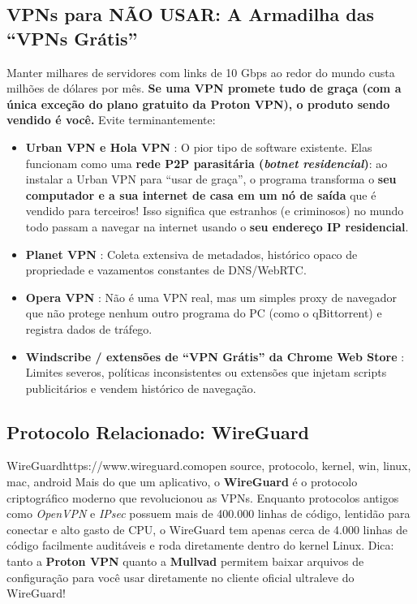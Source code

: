 \documentclass{pousadaguide}
\begin{document}
\subsection{VPNs para NÃO USAR: A Armadilha das “VPNs Grátis”}

\begin{perigo}
Manter milhares de servidores com links de 10 Gbps ao redor do mundo custa milhões de dólares por mês. \textbf{Se uma VPN promete tudo de graça (com a única exceção do plano gratuito da Proton VPN), o produto sendo vendido é você.} Evite terminantemente:
\begin{itemize}
  \item \textbf{Urban VPN e Hola VPN} : O pior tipo de software existente. Elas funcionam como uma \textbf{rede P2P parasitária (\emph{botnet residencial})}: ao instalar a Urban VPN para ``usar de graça'', o programa transforma o \textbf{seu computador e a sua internet de casa em um nó de saída} que é vendido para terceiros! Isso significa que estranhos (e criminosos) no mundo todo passam a navegar na internet usando o \textbf{seu endereço IP residencial}.
  \item \textbf{Planet VPN} : Coleta extensiva de metadados, histórico opaco de propriedade e vazamentos constantes de DNS/WebRTC.
  \item \textbf{Opera VPN} : Não é uma VPN real, mas um simples proxy de navegador que não protege nenhum outro programa do PC (como o qBittorrent) e registra dados de tráfego.
  \item \textbf{Windscribe / extensões de ``VPN Grátis'' da Chrome Web Store} : Limites severos, políticas inconsistentes ou extensões que injetam scripts publicitários e vendem histórico de navegação.
\end{itemize}
\end{perigo}

\subsection{Protocolo Relacionado: WireGuard}

\begin{ferramenta}[recomendado,logo=wireguard]{WireGuard}{https://www.wireguard.com}{open source, protocolo, kernel, win, linux, mac, android}
Mais do que um aplicativo, o \textbf{WireGuard} é o protocolo criptográfico moderno que revolucionou as VPNs. Enquanto protocolos antigos como \emph{OpenVPN} e \emph{IPsec} possuem mais de 400.000 linhas de código, lentidão para conectar e alto gasto de CPU, o WireGuard tem apenas cerca de 4.000 linhas de código facilmente auditáveis e roda diretamente dentro do kernel Linux. Dica: tanto a \textbf{Proton VPN} quanto a \textbf{Mullvad} permitem baixar arquivos de configuração  para você usar diretamente no cliente oficial ultraleve do WireGuard! 
\end{ferramenta}
\end{document}
